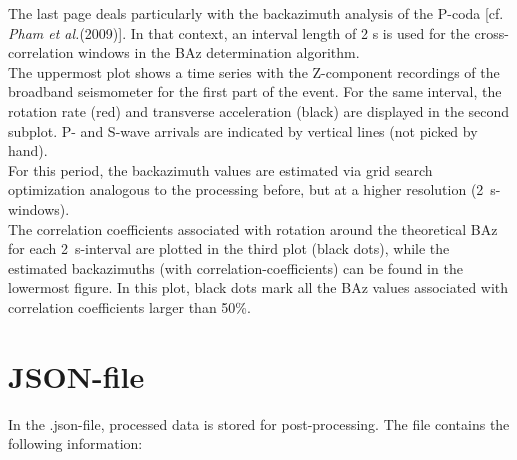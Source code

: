 \documentclass[a4paper,10pt]{article}
\begin{document}
The last page deals particularly with the backazimuth analysis of the P-coda [cf. \textit{Pham et al.}(2009)]. In that context, an interval length of 2 s is used for the cross-correlation windows in the BAz determination algorithm.\\

The uppermost plot shows a time series with the Z-component recordings of the broadband seismometer for the first part of the event.  For the same interval, the rotation rate (red) and transverse acceleration (black) are displayed in the second subplot.  P- and S-wave arrivals are indicated by vertical lines (not picked by hand).\\
For this period, the backazimuth values are estimated via grid search optimization analogous to the processing
before, but at a higher resolution (2~s-windows).\\
The correlation coefficients associated with rotation around the theoretical BAz for each 2~s-interval are plotted
in the third plot (black dots), while the estimated backazimuths (with correlation-coefficients) can be found in
the lowermost figure.  In this plot, black dots mark all the BAz values associated with correlation coefficients
larger than 50\%.
\newpage

\section*{JSON-file}
In the .json-file, processed data is stored for post-processing. The file contains the following information:
\end{document}
